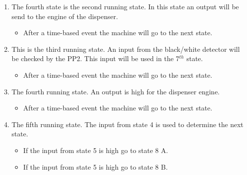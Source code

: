 \documentclass[a4paper,oneside,11pt]{report}
\begin{document}
\begin{enumerate}
\pagebreak

\item The fourth state is the second running state. In this state an output will be send to the engine of the dispenser.
    \begin{itemize}
        \item After a time-based event the machine will go to the next state.
    \end{itemize}

\item This is the third running state. An input from the black/white detector will be checked by the PP2. This input will be used in the 7$^{th}$ state.
    \begin{itemize}
        \item After a time-based event the machine will go to the next state.
    \end{itemize}

\item The fourth running state. An output is high for the dispenser engine.
    \begin{itemize}
        \item After a time-based event the machine will go to the next state.
    \end{itemize}

\item The fifth running state. The input from state 4 is used to determine the next state.
    \begin{itemize}
        \item If the input from state 5 is high go to state 8 A.
        \item If the input from state 5 is high go to state 8 B.
    \end{itemize}


\end{enumerate}
\end{document}
